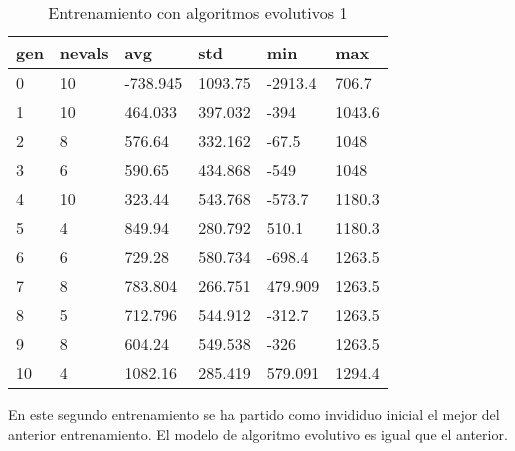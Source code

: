 \begin{table}[]
\centering
\begin{tabular}{|l|l|l|l|l|l|}
\hline
\rowcolor[HTML]{EFEFEF} 
gen & nevals & avg      & std     & min     & max    \\ \hline
0   & 10     & -738.945 & 1093.75 & -2913.4 & 706.7  \\ \hline
1   & 10     & 464.033  & 397.032 & -394    & 1043.6 \\ \hline
2   & 8      & 576.64   & 332.162 & -67.5   & 1048   \\ \hline
3   & 6      & 590.65   & 434.868 & -549    & 1048   \\ \hline
4   & 10     & 323.44   & 543.768 & -573.7  & 1180.3 \\ \hline
5   & 4      & 849.94   & 280.792 & 510.1   & 1180.3 \\ \hline
6   & 6      & 729.28   & 580.734 & -698.4  & 1263.5 \\ \hline
7   & 8      & 783.804  & 266.751 & 479.909 & 1263.5 \\ \hline
8   & 5      & 712.796  & 544.912 & -312.7  & 1263.5 \\ \hline
9   & 8      & 604.24   & 549.538 & -326    & 1263.5 \\ \hline
10  & 4      & 1082.16  & 285.419 & 579.091 & 1294.4 \\ \hline
\end{tabular}
\caption{Entrenamiento con algoritmos evolutivos 1}
\label{tab:entr1}
\end{table}



En este segundo entrenamiento se ha partido como invididuo inicial el mejor del anterior entrenamiento. El modelo de algoritmo evolutivo es igual que el anterior.

